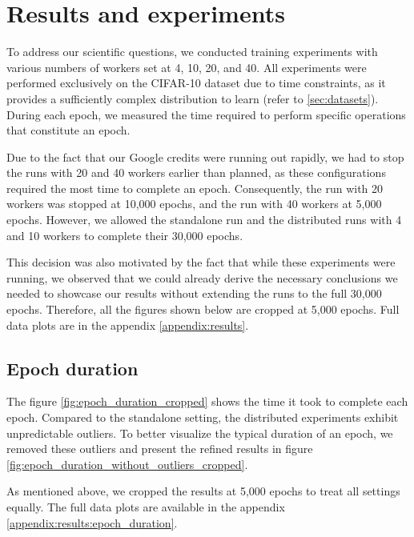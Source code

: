 \chapter{Results and experiments}
To address our scientific questions, we conducted training experiments with various numbers of workers set at 4, 10, 20, and 40. All experiments were performed exclusively on the CIFAR-10 dataset due to time constraints, as it provides a sufficiently complex distribution to learn (refer to \ref{sec:datasets}). During each epoch, we measured the time required to perform specific operations that constitute an epoch.

Due to the fact that our Google credits were running out rapidly, we had to stop the runs with 20 and 40 workers earlier than planned, as these configurations required the most time to complete an epoch. Consequently, the run with 20 workers was stopped at 10,000 epochs, and the run with 40 workers at 5,000 epochs. However, we allowed the standalone run and the distributed runs with 4 and 10 workers to complete their 30,000 epochs.

This decision was also motivated by the fact that while these experiments were running, we observed that we could already derive the necessary conclusions we needed to showcase our results without extending the runs to the full 30,000 epochs. Therefore, all the figures shown below are cropped at 5,000 epochs. Full data plots are in the appendix \ref{appendix:results}.

\newpage
\section{Epoch duration}
The figure \ref{fig:epoch_duration_cropped} shows the time it took to complete each epoch. Compared to the standalone setting, the distributed experiments exhibit unpredictable outliers. To better visualize the typical duration of an epoch, we removed these outliers and present the refined results in figure \ref{fig:epoch_duration_without_outliers_cropped}.

As mentioned above, we cropped the results at 5,000 epochs to treat all settings equally. The full data plots are available in the appendix 
\ref{appendix:results:epoch_duration}.

